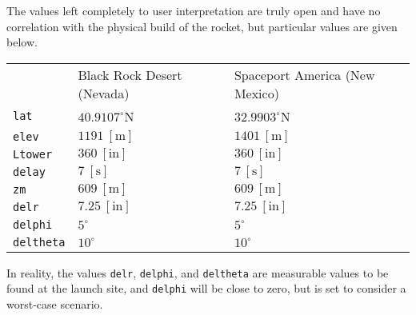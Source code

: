\documentclass[11pt]{thesis}
\numberwithin{equation}{section}
\begin{document}
The values left completely to user interpretation are truly open and have no correlation with the physical build of the rocket, but particular values are given below.
{\tabulinesep=1.0mm
\begin{longtable}[l]{l l l}
 & Black Rock Desert (Nevada) & Spaceport America (New Mexico) \\
\texttt{lat} & $40.9107^\circ$N & $32.9903^\circ$N \\
\texttt{elev} & $1191 \ [\si{\m}]$ & $1401 \ [\si{\m}]$ \\
\texttt{Ltower} & $360 \ [\mathrm{in}]$ & $360 \ [\mathrm{in}]$ \\
\texttt{delay} & $7 \ [\si{\s}]$ & $7 \ [\si{\s}]$ \\
\texttt{zm} & $609 \ [\si{\m}]$ & $609 \ [\si{\m}]$ \\
\texttt{delr} & $7.25 \ [\mathrm{in}]$ & $7.25 \ [\mathrm{in}]$ \\
\texttt{delphi} & $5^\circ$ & $5^\circ$ \\
\texttt{deltheta} & $10^\circ$ & $10^\circ$ \\
\end{longtable}}
In reality, the values \texttt{delr}, \texttt{delphi}, and \texttt{deltheta} are measurable values to be found at the launch site, and \texttt{delphi} will be close to zero, but is set to consider a worst-case scenario.
\end{document}
